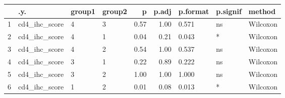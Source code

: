 \documentclass{article}
\begin{document}


\begin{table}[ht]
\centering
\begin{tabular}{rlllrrlll}
  \hline
 & .y. & group1 & group2 & p & p.adj & p.format & p.signif & method \\
  \hline
1 & cd4\_ihc\_score & 4 & 3 & 0.57 & 1.00 & 0.571 & ns & Wilcoxon \\
  2 & cd4\_ihc\_score & 4 & 1 & 0.04 & 0.21 & 0.043 & * & Wilcoxon \\
  3 & cd4\_ihc\_score & 4 & 2 & 0.54 & 1.00 & 0.537 & ns & Wilcoxon \\
  4 & cd4\_ihc\_score & 3 & 1 & 0.22 & 0.89 & 0.222 & ns & Wilcoxon \\
  5 & cd4\_ihc\_score & 3 & 2 & 1.00 & 1.00 & 1.000 & ns & Wilcoxon \\
  6 & cd4\_ihc\_score & 1 & 2 & 0.01 & 0.08 & 0.013 & * & Wilcoxon \\
   \hline
\end{tabular}
\end{table}
\end{document}
